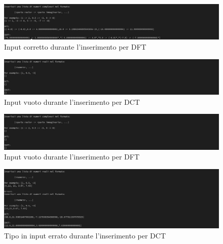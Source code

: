 \documentclass{report}
\begin{document}
    \begin{center}
      \begin{figure}[h!]
        \includegraphics[width=\textwidth]{test_hs_2.jpg}
        \caption{Input corretto durante l'inserimento per DFT}
      \end{figure}
    \end{center}

    \begin{center}
      \begin{figure}
        \includegraphics[width=\textwidth]{test_hs_3.jpg}
        \caption{Input vuoto durante l'inserimento per DCT}
      \end{figure}
    \end{center}

    \begin{center}
      \begin{figure}
        \includegraphics[width=\textwidth]{test_hs_4.jpg}
        \caption{Input vuoto durante l'inserimento per DFT}
      \end{figure}
    \end{center}

    \begin{center}
      \begin{figure}
        \includegraphics[width=\textwidth]{test_hs_5.jpg}
        \caption{Tipo in input errato durante l'inserimento per DCT}
      \end{figure}
    \end{center}
\end{document}
